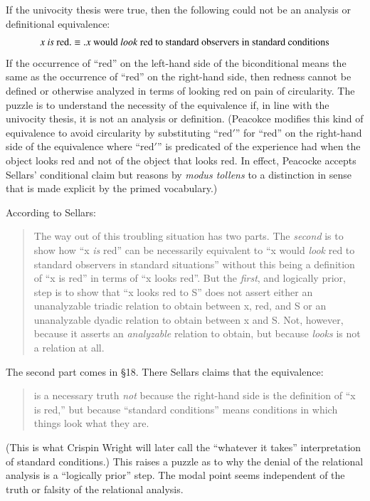 \documentclass[11pt]{article}
\begin{document}
If the univocity thesis were true, then the following could not be an analysis or definitional equivalence:
\[
    x \mbox{ \emph{is} red} . \equiv . x \mbox{ would \emph{look} red to standard observers in standard conditions}
\]
If the occurrence of ``red'' on the left-hand side of the biconditional means the same as the occurrence of ``red'' on the right-hand side, then redness cannot be defined or otherwise analyzed in terms of looking red on pain of circularity. The puzzle is to understand the necessity of the equivalence if, in line with the univocity thesis, it is not an analysis or definition. (Peacokce modifies this kind of equivalence to avoid circularity by substituting ``\( \mbox{red}' \)'' for ``red'' on the right-hand side of the equivalence where ``\( \mbox{red}' \)'' is predicated of the experience had when the object looks red and not of the object that looks red. In effect, Peacocke accepts Sellars' conditional claim but reasons by \emph{modus tollens} to a distinction in sense that is made explicit by the primed vocabulary.)

According to Sellars:
\begin{quote}
    The way out of this troubling situation has two parts. The \emph{second} is to show how ``x \emph{is} red'' can be necessarily equivalent to ``x would \emph{look} red to standard observers in standard situations'' without this being a definition of ``x is red'' in terms of ``x looks red''. But the \emph{first}, and logically prior, step is to show that ``x looks red to S'' does not assert either an unanalyzable triadic relation to obtain between x, red, and S or an unanalyzable dyadic relation to obtain between x and S. Not, however, because it asserts an \emph{analyzable} relation to obtain, but because \emph{looks} is not a relation at all.
\end{quote}
The second part comes in §18. There Sellars claims that the equivalence:
\begin{quote}
    is a necessary truth \emph{not} because the right-hand side is the definition of ``x is red,'' but because ``standard conditions'' means conditions in which things look what they are.
\end{quote}
(This is what Crispin Wright will later call the ``whatever it takes'' interpretation of standard conditions.) This raises a puzzle as to why the denial of the relational analysis is a ``logically prior'' step. The modal point seems independent of the truth or falsity of the relational analysis.
\end{document}
